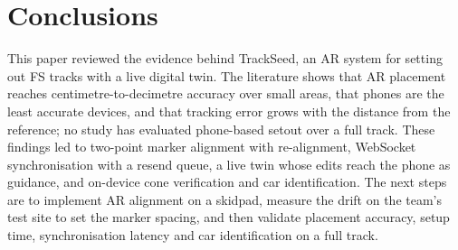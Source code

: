 \section{Conclusions}
This paper reviewed the evidence behind TrackSeed, an AR system for setting out FS tracks with a live digital twin. The literature shows that AR placement reaches centimetre-to-decimetre accuracy over small areas, that phones are the least accurate devices, and that tracking error grows with the distance from the reference; no study has evaluated phone-based setout over a full track. These findings led to two-point marker alignment with re-alignment, WebSocket synchronisation with a resend queue, a live twin whose edits reach the phone as guidance, and on-device cone verification and car identification. The next steps are to implement AR alignment on a skidpad, measure the drift on the team's test site to set the marker spacing, and then validate placement accuracy, setup time, synchronisation latency and car identification on a full track.

